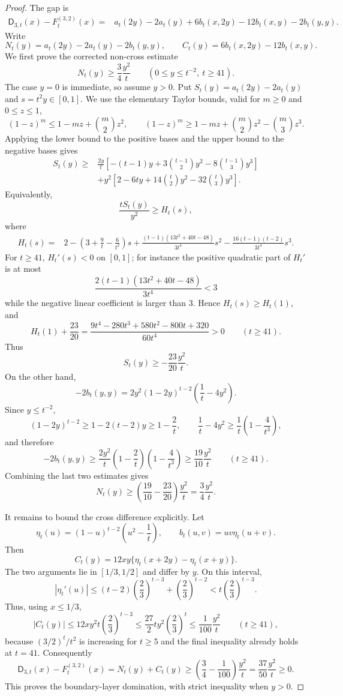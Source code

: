 \documentclass[11pt]{article}
\theoremstyle{definition}
\begin{document}
\begin{proof}
The gap is
\[
\begin{aligned}
\mathsf D_{3,t}(x)-F^{(3,2)}_t(x)
={}&a_t(2y)-2a_t(y)+6b_t(x,2y)-12b_t(x,y)-2b_t(y,y).
\end{aligned}
\]
Write
\[
  N_t(y)=a_t(2y)-2a_t(y)-2b_t(y,y),
  \qquad
  C_t(y)=6b_t(x,2y)-12b_t(x,y).
\]
We first prove the corrected non-cross estimate
\[
  N_t(y)\ge \frac34\frac{y^2}{t}
  \qquad(0\le y\le t^{-2},\ t\ge41).
\]
The case $y=0$ is immediate, so assume $y>0$.  Put
$S_t(y)=a_t(2y)-2a_t(y)$ and $s=t^2y\in[0,1]$.  We use the elementary Taylor
bounds, valid for $m\ge0$ and $0\le z\le1$,
\[
  (1-z)^m\le 1-mz+\binom m2z^2,
  \qquad
  (1-z)^m\ge 1-mz+\binom m2z^2-\binom m3z^3.
\]
Applying the lower bound to the positive bases and the upper bound to the
negative bases gives
\[
\begin{aligned}
S_t(y)
\ge{}&\frac{2y}{t}\left[-(t-1)y+3\binom{t-1}{2}y^2
       -8\binom{t-1}{3}y^3\right] \\
&+y^2\left[2-6ty+14\binom t2y^2-32\binom t3y^3\right].
\end{aligned}
\]
Equivalently,
\[
  \frac{tS_t(y)}{y^2}\ge H_t(s),
\]
where
\[
\begin{aligned}
H_t(s)={}&2-\left(3+\frac9t-\frac6{t^2}\right)s
+\frac{(t-1)(13t^2+40t-48)}{3t^4}s^2
-\frac{16(t-1)(t-2)}{3t^4}s^3.
\end{aligned}
\]
For $t\ge41$, $H_t'(s)<0$ on $[0,1]$; for instance the positive quadratic
part of $H_t'$ is at most
\[
  \frac{2(t-1)(13t^2+40t-48)}{3t^4}<3
\]
while the negative linear coefficient is larger than $3$.  Hence
$H_t(s)\ge H_t(1)$, and
\[
  H_t(1)+\frac{23}{20}
  =\frac{9t^4-280t^3+580t^2-800t+320}{60t^4}>0
  \qquad(t\ge41).
\]
Thus
\[
  S_t(y)\ge -\frac{23}{20}\frac{y^2}{t}.
\]
On the other hand,
\[
  -2b_t(y,y)=2y^2(1-2y)^{t-2}\left(\frac1t-4y^2\right).
\]
Since $y\le t^{-2}$,
\[
  (1-2y)^{t-2}\ge 1-2(t-2)y\ge1-\frac2t,
  \qquad
  \frac1t-4y^2\ge\frac1t\left(1-\frac4{t^3}\right),
\]
and therefore
\[
  -2b_t(y,y)
  \ge \frac{2y^2}{t}\left(1-\frac2t\right)
       \left(1-\frac4{t^3}\right)
  \ge \frac{19}{10}\frac{y^2}{t}
  \qquad(t\ge41).
\]
Combining the last two estimates gives
\[
  N_t(y)\ge\left(\frac{19}{10}-\frac{23}{20}\right)\frac{y^2}{t}
  =\frac34\frac{y^2}{t}.
\]

It remains to bound the cross difference explicitly.  Let
\[
  \eta_t(u)=(1-u)^{t-2}\left(u^2-\frac1t\right),
  \qquad b_t(u,v)=uv\eta_t(u+v).
\]
Then
\[
  C_t(y)=12xy\{\eta_t(x+2y)-\eta_t(x+y)\}.
\]
The two arguments lie in $[1/3,1/2]$ and differ by $y$.  On this interval,
\[
  |\eta_t'(u)|
  \le (t-2)\left(\frac23\right)^{t-3}
      +\left(\frac23\right)^{t-2}
  < t\left(\frac23\right)^{t-3}.
\]
Thus, using $x\le1/3$,
\[
  |C_t(y)|
  \le 12xy^2 t\left(\frac23\right)^{t-3}
  \le \frac{27}{2}t y^2\left(\frac23\right)^t
  \le \frac1{100}\frac{y^2}{t}
  \qquad(t\ge41),
\]
because $(3/2)^t/t^2$ is increasing for $t\ge5$ and the final inequality
already holds at $t=41$.
Consequently
\[
\mathsf D_{3,t}(x)-F^{(3,2)}_t(x)
=N_t(y)+C_t(y)
\ge\left(\frac34-\frac1{100}\right)\frac{y^2}{t}
=\frac{37}{50}\frac{y^2}{t}\ge0.
\]
This proves the boundary-layer domination, with strict inequality when
$y>0$.
\end{proof}
\end{document}
